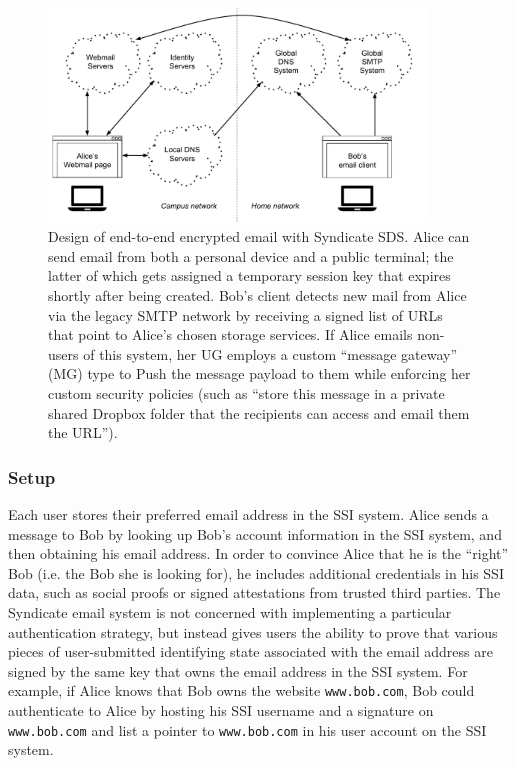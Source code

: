 \begin{figure}[h]
   \centering
   \includegraphics[width=0.9\textwidth,page=24]{figures/dissertation-figures}
   \caption{Design of end-to-end encrypted email with Syndicate SDS.  Alice can
   send email from both a personal device and a public terminal; the latter of
   which gets assigned a temporary session key that expires shortly after being
   created.  Bob's client detects new mail from Alice via the legacy SMTP
   network by receiving a signed list of URLs that point to Alice's chosen
   storage services.  If Alice emails non-users of this system, her UG employs a
   custom ``message gateway'' (MG) type to Push the message payload to them
   while enforcing her custom security policies (such as ``store this message in
   a private shared Dropbox folder that the recipients can access and email them
   the URL'').}
   \label{fig:chap4-syndicate-mail}
\end{figure}

\subsubsection{Setup}

Each user stores their preferred email address in the SSI system.
Alice sends a message to Bob by looking up Bob's account
information in the SSI system, and then obtaining his email address.  In order
to convince Alice that he is the ``right'' Bob (i.e. the Bob she is looking
for), he includes additional credentials in his SSI data, such as social proofs
or signed attestations from trusted third parties.  The Syndicate email system
is not concerned with implementing a particular authentication strategy, but instead gives users
the ability to prove that various pieces of user-submitted identifying state associated with
the email address are signed by the same key that owns the email address
in the SSI system.  For example, if Alice knows that Bob owns the website
\texttt{www.bob.com}, Bob could authenticate to Alice by hosting his SSI
username and a signature on
\texttt{www.bob.com} and list a pointer to \texttt{www.bob.com} in his user
account on the SSI system.

